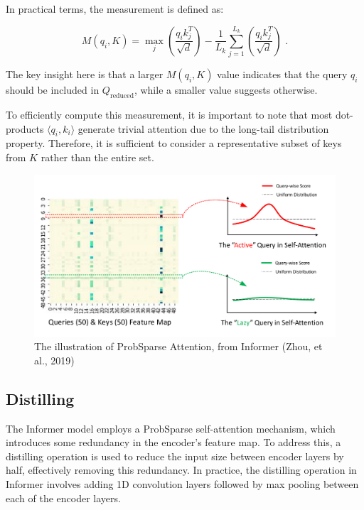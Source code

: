 In practical terms, the measurement is defined as:

\begin{equation}
M(q_i, K) = \max_j \left( \frac{q_i k_j^T}{\sqrt{d}} \right) - \frac{1}{L_k} \sum_{j=1}^{L_k} \left( \frac{q_i k_j^T}{\sqrt{d}} \right) \text{ .}
\end{equation}

The key insight here is that a larger \( M(q_i, K) \) value indicates that the query \( q_i \) should be included in \( Q_{\text{reduced}} \), while a smaller value suggests otherwise.

To efficiently compute this measurement, it is important to note that most dot-products \( \langle q_i, k_i \rangle \) generate trivial attention due to the long-tail distribution property. Therefore, it is sufficient to consider a representative subset of keys from \( K \) rather than the entire set.

\begin{figure}[htbp]
    \centering
    \includegraphics[width=12cm]{3_ChapterTranformerVariants/figuras/Queries_ProbSparceAttention.png}
    \caption{The illustration of ProbSparse Attention, from Informer (Zhou, et al., 2019)\cite{zhou2021informerefficienttransformerlong}}
    \end{figure}

\subsection{Distilling}
The Informer model employs a ProbSparse self-attention mechanism, which introduces some redundancy in the encoder’s feature map. To address this, a distilling operation is used to reduce the input size between encoder layers by half, effectively removing this redundancy. In practice, the distilling operation in Informer involves adding 1D convolution layers followed by max pooling between each of the encoder layers.

